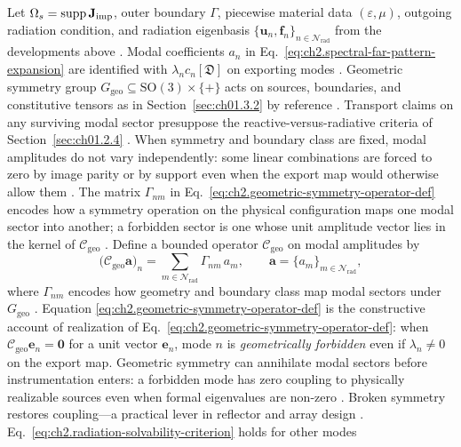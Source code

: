 Let \(\Omega_s=\operatorname{supp}\mathbf{J}_{\mathrm{imp}}\), outer boundary \(\Gamma\), piecewise material
data \((\varepsilon,\mu)\), outgoing radiation condition, and radiation eigenbasis
\(\{\mathbf{u}_n,\mathbf{f}_n\}_{n\in\mathcal{N}_{\mathrm{rad}}}\) from the developments above
\cite{stratton1941}. Modal coefficients \(a_n\) in Eq.~\eqref{eq:ch2.spectral-far-pattern-expansion}
are identified with \(\lambda_n c_n[\mathfrak{D}]\) on exporting modes
\cite{stratton1941}. Geometric symmetry group \(G_{\mathrm{geo}}\subseteq\mathrm{SO}(3)\times\{+\}\)
acts on sources, boundaries, and constitutive tensors as in Section~\ref{sec:ch01.3.2} by reference
\cite{stratton1941}. Transport claims on any surviving modal sector presuppose the
reactive-versus-radiative criteria of Section~\ref{sec:ch01.2.4} \cite{harrington2001}.
When symmetry and boundary class are fixed, modal amplitudes do not vary independently: some
linear combinations are forced to zero by image parity or by support even when the export map
would otherwise allow them \cite{stratton1941}. The matrix \(\Gamma_{nm}\) in
Eq.~\eqref{eq:ch2.geometric-symmetry-operator-def} encodes how a symmetry operation on the
physical configuration maps one modal sector into another; a forbidden sector is one whose
unit amplitude vector lies in the kernel of \(\mathcal{C}_{\mathrm{geo}}\)
\cite{stratton1941}. Define a bounded operator \(\mathcal{C}_{\mathrm{geo}}\) on modal
amplitudes by
\begin{equation}
\label{eq:ch2.geometric-symmetry-operator-def}
\big(\mathcal{C}_{\mathrm{geo}}\mathbf{a}\big)_n
=
\sum_{m\in\mathcal{N}_{\mathrm{rad}}}
\Gamma_{nm}\,a_m,
\qquad
\mathbf{a}=\{a_m\}_{m\in\mathcal{N}_{\mathrm{rad}}},
\end{equation}
where \(\Gamma_{nm}\) encodes how geometry and boundary class map modal sectors under
\(G_{\mathrm{geo}}\) \cite{stratton1941}. Equation
\eqref{eq:ch2.geometric-symmetry-operator-def} is the constructive account of
realization of Eq.~\eqref{eq:ch2.geometric-symmetry-operator-def}: when
\(\mathcal{C}_{\mathrm{geo}}\mathbf{e}_n=\mathbf{0}\) for a unit vector \(\mathbf{e}_n\),
mode \(n\) is \emph{geometrically forbidden} even if \(\lambda_n\neq 0\) on the export map.
Geometric symmetry can annihilate modal sectors before instrumentation enters: a forbidden mode
has zero coupling to physically realizable sources even when formal eigenvalues are non-zero
\cite{stratton1941}. Broken symmetry restores coupling---a practical lever in reflector and
array design \cite{collin2001}.
Eq.~\eqref{eq:ch2.radiation-solvability-criterion} holds for other modes
